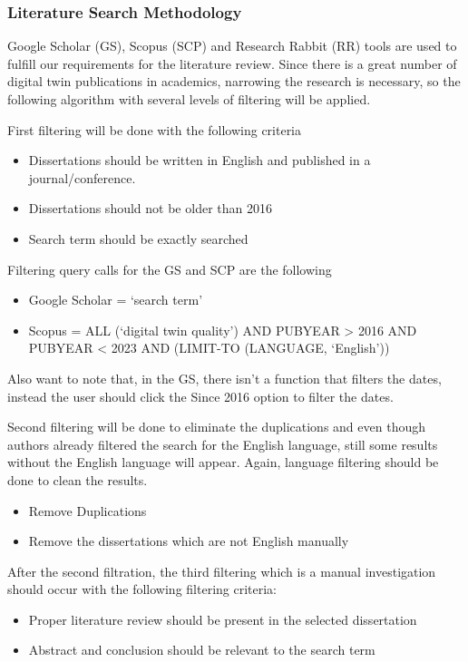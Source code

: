 \documentclass[9pt,conference]{IEEEtran}
\begin{document}
    \subsubsection*{Literature Search Methodology}
    Google Scholar (GS), Scopus (SCP) and Research Rabbit (RR) tools are used to fulfill our requirements for the literature review. Since there is a great number of digital twin publications in academics,
    narrowing the research is necessary, so the following algorithm with several levels of filtering will be applied.

    First filtering will be done with the following criteria

    \begin{itemize}
        \item  Dissertations should be written in English and published in a journal/conference.
        \item  Dissertations should not be older than 2016
        \item  Search term should be exactly searched
    \end{itemize}

    Filtering query calls for the GS and SCP are the following
    \begin{itemize}
        \item Google Scholar = `search term'
        \item Scopus = ALL (`digital twin quality') AND PUBYEAR > 2016 AND PUBYEAR < 2023 AND (LIMIT-TO (LANGUAGE, `English'))
    \end{itemize}
    Also want to note that, in the GS, there isn't a function that filters the dates, instead the user should click the Since 2016 option to filter the dates.

    Second filtering will be done to eliminate the duplications and even though authors already filtered the search for the English language, 
    still some results without the English language will appear. Again, language filtering should be done to clean the results.
    \begin{itemize}
        \item Remove Duplications
        \item Remove the dissertations which are not English manually
    \end{itemize}

    After the second filtration, the third filtering which is a manual investigation should occur with the following filtering criteria:
    \begin{itemize}
        \item  Proper literature review should be present in the selected dissertation
        \item  Abstract and conclusion should be relevant to the search term
    \end{itemize}
\end{document}
